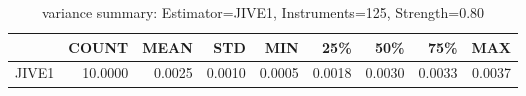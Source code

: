 \begin{table}[ht]
\centering
\caption{variance summary: Estimator=JIVE1, Instruments=125, Strength=0.80}
\begin{tabular}{lrrrrrrrr}
\toprule
 & COUNT & MEAN & STD & MIN & 25\% & 50\% & 75\% & MAX \\
\midrule
JIVE1 & 10.0000 & 0.0025 & 0.0010 & 0.0005 & 0.0018 & 0.0030 & 0.0033 & 0.0037 \\
\bottomrule
\end{tabular}
\end{table}
